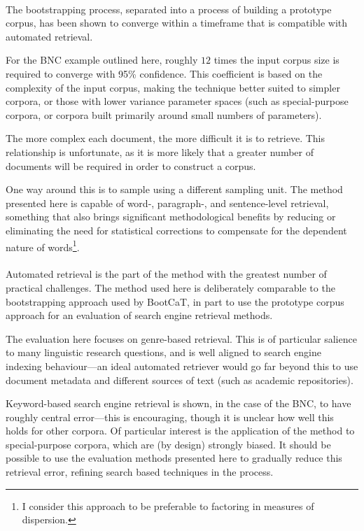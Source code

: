 \paragraph{}

The bootstrapping process, separated into a process of building a prototype corpus, has been shown to converge within a timeframe that is compatible with automated retrieval.

For the BNC example outlined here, roughly $12$ times the input corpus size is required to converge with 95\% confidence.  This coefficient is based on the complexity of the input corpus, making the technique better suited to simpler corpora, or those with lower variance parameter spaces (such as special-purpose corpora, or corpora built primarily around small numbers of parameters).

The more complex each document, the more difficult it is to retrieve.  This relationship is unfortunate, as it is more likely that a greater number of documents will be required in order to construct a corpus.

One way around this is to sample using a different sampling unit.  The method presented here is capable of word-, paragraph-, and sentence-level retrieval, something that also brings significant methodological benefits by reducing or eliminating the need for statistical corrections to compensate for the dependent nature of words\footnote{I consider this approach to be preferable to factoring in measures of dispersion.}.



\paragraph{}

Automated retrieval is the part of the method with the greatest number of practical challenges. The method used here is deliberately comparable to the bootstrapping approach used by BootCaT\cite{baroni2004bootcat}, in part to use the prototype corpus approach for an evaluation of search engine retrieval methods.

The evaluation here focuses on genre-based retrieval.  This is of particular salience to many linguistic research questions, and is well aligned to search engine indexing behaviour---an ideal automated retriever would go far beyond this to use document metadata and different sources of text (such as academic repositories).

Keyword-based search engine retrieval is shown, in the case of the BNC, to have roughly central error---this is encouraging, though it is unclear how well this holds for other corpora.  Of particular interest is the application of the method to special-purpose corpora, which are (by design) strongly biased.  It should be possible to use the evaluation methods presented here to gradually reduce this retrieval error, refining search based techniques in the process.

